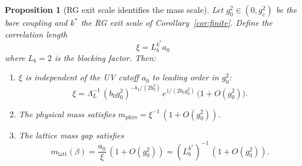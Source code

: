 \documentclass[11pt,a4paper]{amsart}
\newtheorem{proposition}[theorem]{Proposition}
\theoremstyle{definition}
\newcommand{\gB}{g^2_c}
\begin{document}
\begin{proposition}[RG exit scale identifies the mass scale]
\label{prop:rg_exit_mass}
Let $g^2_0 \in (0,\gB)$ be the bare coupling and $k^*$ the RG exit scale of
Corollary~\ref{cor:finite}.  Define the correlation length
\begin{equation}
\label{eq:xi_def}
   \xi = L_b^{k^*} a_0
\end{equation}
where $L_b = 2$ is the blocking factor.  Then:
\begin{enumerate}[label=(\roman*)]
\item $\xi$ is independent of the UV cutoff $a_0$ to leading order in $g^2_0$:
      \[
         \xi = \Lambda_L^{-1}\,(b_0 g^2_0)^{-b_1/(2b_0^2)}\,e^{1/(2b_0 g^2_0)}
         \,\bigl(1 + O(g^2_0)\bigr).
      \]
\item The physical mass satisfies $m_{\mathrm{phys}} = \xi^{-1}\,(1 + O(g^2_0))$.
\item The lattice mass gap satisfies
      \[
         m_{\mathrm{latt}}(\beta) = \frac{a_0}{\xi}\,(1 + O(g^2_0))
         = (L_b^{k^*})^{-1}\,(1 + O(g^2_0)).
      \]
\end{enumerate}
\end{proposition}
\end{document}
